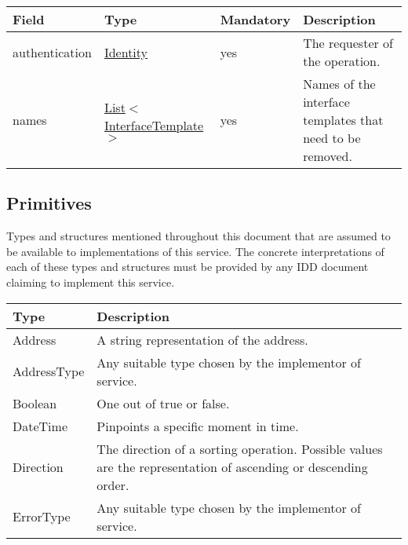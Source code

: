 \documentclass[a4paper]{arrowhead}
\newcommand{\pdef}[1]{{\textcolor{ArrowheadGrey}{#1\label{sec:model:primitives:#1}\label{sec:model:primitives:#1s}\label{sec:model:primitives:#1es}}}}
\newcommand{\pref}[1]{{\textcolor{ArrowheadGrey}{\hyperref[sec:model:primitives:#1]{#1}}}}
\begin{document}

\begin{table}[ht!]
\begin{tabularx}{\textwidth}{| p{2.5cm} | p{3.8cm} | p{2cm} | X |} \hline
\rowcolor{gray!33} Field & Type & Mandatory & Description \\ \hline
authentication & \hyperref[sec:model:Identity]{Identity} & yes & The requester of the operation. \\ \hline
names &  \pref{List}$<$\pref{InterfaceTemplate}$>$ & yes & Names of the interface templates that need to be removed. \\ \hline
\end{tabularx}
\end{table}

\subsection{Primitives}
\label{sec:model:primitives}

Types and structures mentioned throughout this document that are assumed to be available to implementations of this service.
The concrete interpretations of each of these types and structures must be provided by any IDD document claiming to implement this service.

\begin{table}[ht!]
\begin{tabularx}{\textwidth}{| p{3cm} | X |} \hline
\rowcolor{gray!33} Type & Description \\ \hline
\pdef{Address}          & A string representation of the address. \\ \hline
\pdef{AddressType}      & Any suitable type chosen by the implementor of service. \\ \hline
\pdef{Boolean}          & One out of true or false. \\ \hline
\pdef{DateTime}         & Pinpoints a specific moment in time. \\ \hline
\pdef{Direction}        & The direction of a sorting operation. Possible values are the representation of ascending or descending order. \\ \hline
\pdef{ErrorType}        & Any suitable type chosen by the implementor of service. \\ \hline
\end{tabularx}
\end{table}
\end{document}
